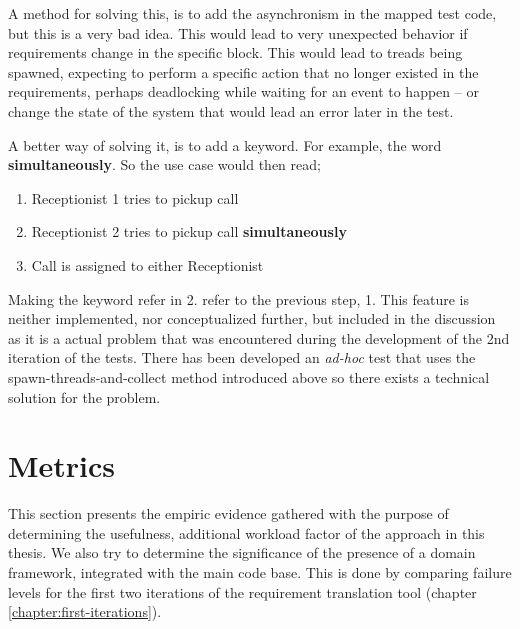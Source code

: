 \noindent A method for solving this, is to add the asynchronism in the mapped test code, but this is a very bad idea. This would lead to very unexpected behavior if requirements change in the specific block. This would lead to treads being spawned, expecting to perform a specific action that no longer existed in the requirements, perhaps deadlocking while waiting for an event to happen -- or change the state of the system that would lead an error later in the test.\medskip

\noindent A better way of solving it, is to add a keyword. For example, the word \textbf{simultaneously}. So the use case would then read;
\begin{enumerate}
 \item Receptionist 1 tries to pickup call
 \item Receptionist 2 tries to pickup call \textbf{simultaneously}
 \item Call is assigned to either Receptionist
\end{enumerate}
Making the keyword refer in 2. refer to the previous step, 1. This feature is neither implemented, nor conceptualized further, but included in the discussion as it is a actual problem that was encountered during the development of the 2nd iteration of the tests. There has been developed an \emph{ad-hoc} test that uses the spawn-threads-and-collect method introduced above so there exists a technical solution for the problem.

\section{Metrics}
This section presents the empiric evidence gathered with the purpose of determining the usefulness, additional workload factor of the approach in this thesis. We also try to determine the significance of the presence of a domain framework, integrated with the main code base. This is done by comparing failure levels for the first two iterations of the requirement translation tool (chapter \ref{chapter:first-iterations}).
